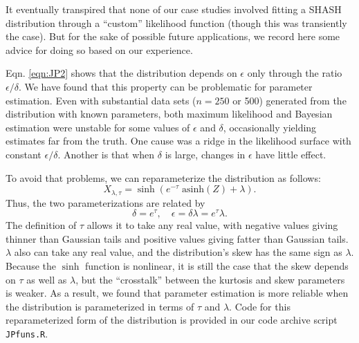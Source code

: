 \documentclass[12pt]{article}
\newcounter{box}
\newcommand{\be}{\begin{equation}}
\newcommand{\ee}{\end{equation}}
\begin{document}
It eventually transpired that none of our case studies involved fitting a SHASH distribution through a ``custom'' likelihood 
function (though this was transiently the case). But for the sake of possible future applications, we record here some 
advice for doing so based on our experience. 

Eqn. \eqref{eqn:JP2} shows that the distribution depends on $\epsilon$ only through the ratio $\epsilon/\delta$. We have found
that this property can be problematic for parameter estimation. Even with substantial data sets ($n=250$ or 500) generated from the 
distribution with known parameters, both maximum likelihood and Bayesian estimation were unstable for some values of $\epsilon$ and $\delta$, 
occasionally yielding estimates far from the truth. One cause was a ridge in the likelihood surface with constant  
$\epsilon/\delta$. Another is that when $\delta$ is large, changes in $\epsilon$ have little effect. 

To avoid that problems, we can reparameterize the distribution as follows: 
\be
X_{\lambda,\tau} = \sinh \left( e^{-\tau} \; \mbox{asinh}(Z) + \lambda \right).
\label{eqn:SJP}
\ee
Thus, the two parameterizations are related by
\be
\delta = e^{\tau}, \quad \epsilon= \delta \lambda =  e^{\tau} \lambda.
\ee
The definition of $\tau$ allows it to take any real value, with negative values giving thinner than Gaussian tails and positive
values giving fatter than Gaussian tails. $\lambda$ also can take any real value, and the distribution's skew has the same sign as $\lambda$. 
Because the $\sinh$ function is nonlinear, it is still the case that the skew depends on $\tau$ as well as $\lambda$, but the
``crosstalk'' between the kurtosis and skew parameters is weaker. As a result, we found that parameter estimation is 
more reliable when the distribution is parameterized in terms of $\tau$ and $\lambda$. Code for this reparameterized form of the distribution is
provided in our code archive script \texttt{JPfuns.R}. 
\end{document}
